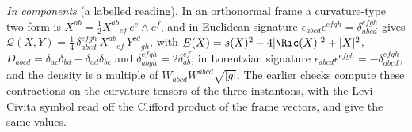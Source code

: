 \emph{In components} (a labelled reading). In an orthonormal frame a curvature-type two-form is $X^{ab} = \tfrac12 X^{ab}{}_{ef}\,e^{e}\wedge e^{f}$, and in Euclidean signature $\epsilon_{abcd}\epsilon^{efgh} = \delta^{efgh}_{abcd}$ gives $\mathcal{Q}(X, Y) = \tfrac14\,\delta^{efgh}_{abcd}\,X^{ab}{}_{ef}\,Y^{cd}{}_{gh}$, with $E(X) = s(X)^{2} - 4|\Ric(X)|^{2} + |X|^{2}$, $D_{abcd} = \delta_{ac}\delta_{bd} - \delta_{ad}\delta_{bc}$ and $\delta^{efgh}_{abgh} = 2\delta^{ef}_{ab}$; in Lorentzian signature $\epsilon_{abcd}\epsilon^{efgh} = -\delta^{efgh}_{abcd}$, and the density is a multiple of $W_{abcd}W^{abcd}\sqrt{|g|}$. The earlier checks compute these contractions on the curvature tensors of the three instantons, with the Levi-Civita symbol read off the Clifford product of the frame vectors, and give the same values.
